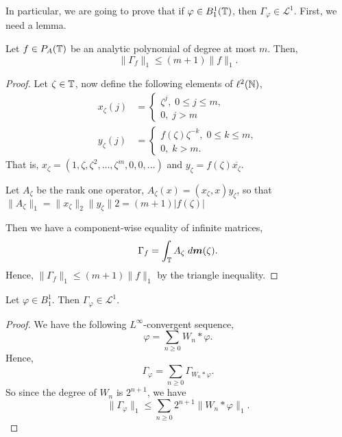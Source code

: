 In particular, we are going to prove that if $\varphi \in B_1^1(\mathbb{T})$, then
$\Gamma_\varphi \in \mathcal{L}^1$. First, we need a lemma.
\begin{lemma}
    Let $f \in P_A(\mathbb{T})$ be an analytic polynomial of degree at most $m$. Then,
    \begin{equation}
        \|\Gamma_f\|_1 \leq (m+1)\|f\|_1.
    \end{equation}
\end{lemma}
\begin{proof}
    Let $\zeta \in \mathbb{T}$, now define the following elements
    of $\ell^2(\mathbb{N})$, 
    \begin{align}
        x_\zeta(j) &= \begin{cases}
            \zeta^j,\;0 \leq j \leq m,\\
            0,\;j > m
        \end{cases}\\
        y_\zeta(j) &= \begin{cases}
            f(\zeta)\zeta^{-k},\;0\leq k \leq m,\\
            0,\;k > m.
        \end{cases}
    \end{align}
    That is, $x_\zeta = (1,\zeta,\zeta^2,\ldots,\zeta^m,0,0,\ldots)$
    and $y_\zeta = f(\zeta)\overline{x_\zeta}$.
    
    Let $A_\zeta$ be the rank one operator, $A_\zeta(x) = (x_\zeta,x)y_\zeta$,
    so that $\|A_\zeta\|_1 = \|x_\zeta\|_2\|y_\zeta\|2 = (m+1)|f(\zeta)|$
    
    Then we have a component-wise equality of infinite matrices,
    \begin{equation}
        \Gamma_f = \int_{\mathbb{T}} A_\zeta\;d\boldsymbol{m}(\zeta).
    \end{equation}
    Hence, $\|\Gamma_f\|_1 \leq (m+1)\|f\|_1$ by the triangle inequality.
\end{proof}
\begin{theorem}
    Let $\varphi \in B_1^1$. Then $\Gamma_\varphi \in \mathcal{L}^1$. 
\end{theorem}
\begin{proof}
    We have the following $L^\infty$-convergent sequence,
    \begin{equation}
        \varphi = \sum_{n\geq 0} W_n*\varphi.
    \end{equation}
    Hence,
    \begin{equation}
        \Gamma_\varphi = \sum_{n\geq 0} \Gamma_{W_n*\varphi}.
    \end{equation}
    So since the degree of $W_n$ is $2^{n+1}$, we have
    \begin{equation}
        \|\Gamma_\varphi\|_1 \leq \sum_{n\geq 0} 2^{n+1}\|W_n*\varphi\|_1.
    \end{equation}
\end{proof}

